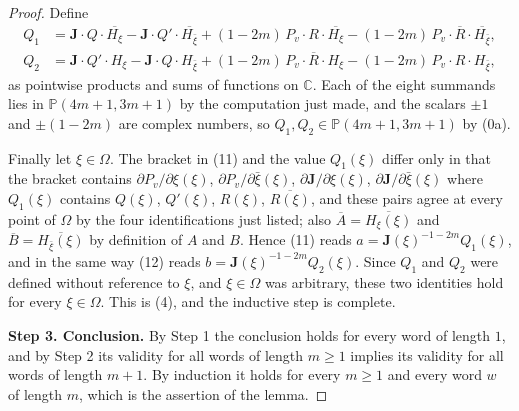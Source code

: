 \begin{proof}
Define
\begin{align*}
  Q_1&=\mathbf{J}\cdot Q\cdot\overline{H_\xi}
      -\mathbf{J}\cdot Q'\cdot\overline{H_{\bar\xi}}
      +(1-2m)\,P_{v}\cdot R\cdot\overline{H_\xi}
      -(1-2m)\,P_{v}\cdot\overline{R}\cdot\overline{H_{\bar\xi}},\\
  Q_2&=\mathbf{J}\cdot Q'\cdot H_\xi
      -\mathbf{J}\cdot Q\cdot H_{\bar\xi}
      +(1-2m)\,P_{v}\cdot\overline{R}\cdot H_\xi
      -(1-2m)\,P_{v}\cdot R\cdot H_{\bar\xi},
\end{align*}
as pointwise products and sums of functions on $\mathbb{C}$.  Each of the eight
summands lies in $\mathbb{P}(4m+1,3m+1)$ by the computation just made, and the
scalars $\pm1$ and $\pm(1-2m)$ are complex numbers, so
$Q_1,Q_2\in\mathbb{P}(4m+1,3m+1)$ by (0a).

Finally let $\xi\in\Omega$.  The bracket in (11) and the value $Q_1(\xi)$
differ only in that the bracket contains
$\partial P_{v}/\partial\xi(\xi)$, $\partial P_{v}/\partial\bar\xi(\xi)$,
$\partial\mathbf{J}/\partial\xi(\xi)$, $\partial\mathbf{J}/\partial\bar\xi(\xi)$
where $Q_1(\xi)$ contains $Q(\xi)$, $Q'(\xi)$, $R(\xi)$, $\overline{R(\xi)}$,
and these pairs agree at every point of $\Omega$ by the four identifications
just listed; also $\overline{A}=\overline{H_\xi(\xi)}$ and
$\overline{B}=\overline{H_{\bar\xi}(\xi)}$ by definition of $A$ and $B$.
Hence (11) reads $a=\mathbf{J}(\xi)^{-1-2m}Q_1(\xi)$, and in the same way (12)
reads $b=\mathbf{J}(\xi)^{-1-2m}Q_2(\xi)$.  Since $Q_1$ and $Q_2$ were defined
without reference to $\xi$, and $\xi\in\Omega$ was arbitrary, these two
identities hold for every $\xi\in\Omega$.  This is (4), and the inductive step
is complete.

\medskip
\noindent\textbf{Step 3.  Conclusion.}  By Step 1 the conclusion holds for
every word of length $1$, and by Step 2 its validity for all words of length
$m\ge1$ implies its validity for all words of length $m+1$.  By induction it
holds for every $m\ge1$ and every word $w$ of length $m$, which is the
assertion of the lemma.
\end{proof}
